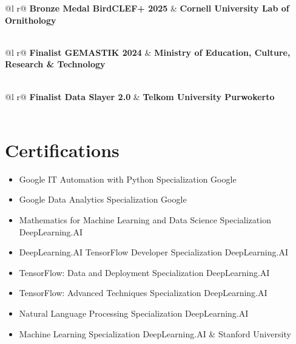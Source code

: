 \documentclass[a4paper,12pt]{article}
\begin{document}
\begin{tabularx}{\linewidth}{ @{}l r@{} }
\textbf{Bronze Medal BirdCLEF+ 2025} & \hfill \textbf{Cornell University Lab of Ornithology} \\[3.75pt]
  \\
\end{tabularx}

\begin{tabularx}{\linewidth}{ @{}l r@{} }
\textbf{Finalist GEMASTIK 2024} & \hfill \textbf{Ministry of Education, Culture, Research \& Technology} \\[3.75pt]
  \\
\end{tabularx}


\begin{tabularx}{\linewidth}{ @{}l r@{} }
\textbf{Finalist Data Slayer 2.0} & \hfill \textbf{Telkom University Purwokerto} \\[3.75pt]
  \\
\end{tabularx}


\section{Certifications}
\begin{itemize}
[nosep, leftmargin=1em, itemsep=3pt, label=--]
\item Google IT Automation with Python Specialization \hfill Google
\item Google Data Analytics Specialization \hfill Google
\item Mathematics for Machine Learning and Data Science Specialization \hfill DeepLearning.AI
\item DeepLearning.AI TensorFlow Developer Specialization \hfill DeepLearning.AI
\item TensorFlow: Data and Deployment Specialization \hfill DeepLearning.AI
\item TensorFlow: Advanced Techniques Specialization \hfill DeepLearning.AI
\item Natural Language Processing Specialization \hfill DeepLearning.AI
\item Machine Learning Specialization \hfill DeepLearning.AI \& Stanford University
\end{itemize}
\end{document}
